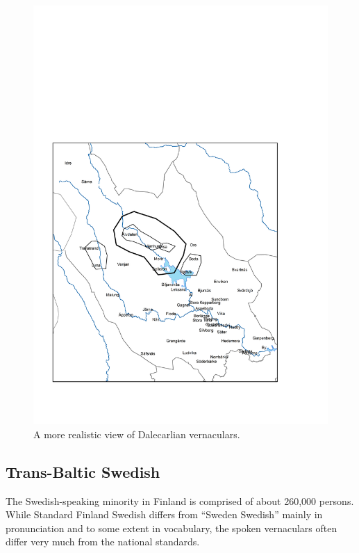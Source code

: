 \begin{figure}[h]

\includegraphics[height=.5\textheight]{figures/8_DalarnaRealistic}
\caption{A more realistic view of Dalecarlian vernaculars.}
\label{map:7}

\end{figure}

\subsection{ Trans-Baltic Swedish}

The Swedish-speaking minority in Finland is comprised of about 260,000 persons. While Standard Finland Swedish differs from “Sweden Swedish” mainly in pronunciation and to some extent in vocabulary, the spoken vernaculars often differ very much from the national standards. 

